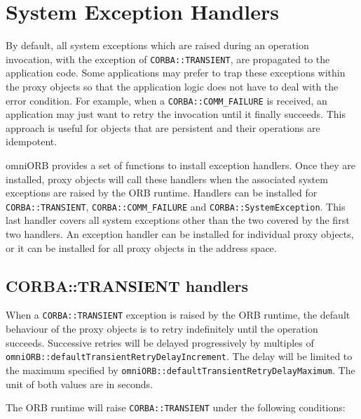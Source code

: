 \documentclass[11pt,twoside,a4paper]{book}
\newcommand{\code}[1]{\texttt{#1}}
\newcommand{\dsc}{\discretionary{}{}{}}
\begin{document}
\mbox{}



\section{System Exception Handlers}

By default, all system exceptions which are raised during an operation
invocation, with the exception of \code{CORBA::TRANSIENT}, are
propagated to the application code. Some applications may prefer to
trap these exceptions within the proxy objects so that the application
logic does not have to deal with the error condition. For example,
when a \code{CORBA::COMM\_FAILURE} is received, an application may
just want to retry the invocation until it finally succeeds. This
approach is useful for objects that are persistent and their
operations are idempotent.

omniORB provides a set of functions to install exception handlers.
Once they are installed, proxy objects will call these handlers when
the associated system exceptions are raised by the ORB runtime.
Handlers can be installed for \code{CORBA::\dsc{}TRANSIENT},
\code{CORBA::COMM\_FAILURE} and \code{CORBA::SystemException}.  This
last handler covers all system exceptions other than the two covered
by the first two handlers. An exception handler can be installed for
individual proxy objects, or it can be installed for all proxy objects
in the address space.


\subsection{CORBA::TRANSIENT handlers}

When a \code{CORBA::TRANSIENT} exception is raised by the ORB runtime,
the default behaviour of the proxy objects is to retry indefinitely
until the operation succeeds. Successive retries will be delayed
progressively by multiples of
\code{omniORB::\dsc{}defaultTransientRetryDelayIncrement}. The delay
will be limited to the maximum specified by
\code{omniORB::defaultTransientRetryDelayMaximum}. The unit of both
values are in seconds.

The ORB runtime will raise \code{CORBA::TRANSIENT} under the following
conditions:
\end{document}
